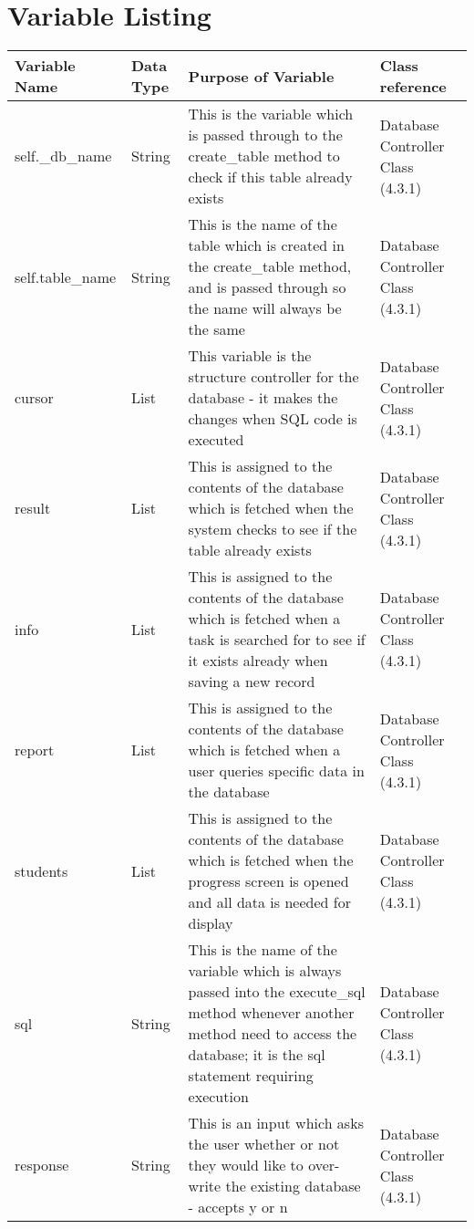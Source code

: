\section{Variable Listing}

\begin{center}
\begin{longtable}{|p{3cm}|p{3cm}|p{4cm}|p{4cm}|} \hline
\textbf{Variable Name} & \textbf{Data Type} & \textbf{Purpose of Variable} & \textbf{Class reference} \\ \hline
self.\_db\_name & String & This is the variable which is passed through to the create\_table method to check if this table already exists & Database Controller Class (4.3.1) \\ \hline
self.table\_name & String & This is the name of the table which is created in the create\_table method, and is passed through so the name will always be the same & Database Controller Class (4.3.1) \\ \hline
cursor & List & This variable is the structure controller for the database - it makes the changes when SQL code is executed & Database Controller Class (4.3.1) \\ \hline
result & List & This is assigned to the contents of the database which is fetched when the system checks to see if the table already exists & Database Controller Class (4.3.1) \\ \hline
info & List & This is assigned to the contents of the database which is fetched when a task is searched for to see if it exists already when saving a new record & Database Controller Class (4.3.1) \\ \hline
report & List & This is assigned to the contents of the database which is fetched when a user queries specific data in the database & Database Controller Class (4.3.1) \\ \hline
students & List & This is assigned to the contents of the database which is fetched when the progress screen is opened and all data is needed for display & Database Controller Class (4.3.1) \\ \hline
sql & String & This is the name of the variable which is always passed into the execute\_sql method whenever another method need to access the database; it is the sql statement requiring execution & Database Controller Class (4.3.1) \\ \hline
response & String & This is an input which asks the user whether or not they would like to over-write the existing database - accepts y or n & Database Controller Class (4.3.1) \\ \hline

\end{longtable}
\end{center}
